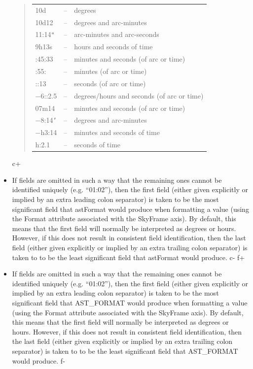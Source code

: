 \documentclass[twoside,11pt]{starlink}
\begin{document}
\begin{itemize}
\begin{quote}
\begin{tabular}{lll}
10d & -- & degrees \\
10d12 & -- & degrees and arc-minutes \\
11:14\texttt{"} & -- & arc-minutes and arc-seconds \\
9h13s & -- & hours and seconds of time \\
:45:33 & -- & minutes and seconds (of arc or time) \\
:55: & -- & minutes (of arc or time) \\
::13 & -- & seconds (of arc or time) \\
$-$6::2.5 & -- & degrees/hours and seconds (of arc or time) \\
07m14 & -- & minutes and seconds (of arc or time) \\
$-$8:14\texttt{'} & -- & degrees and arc-minutes \\
$-$h3:14 & -- & minutes and seconds of time \\
h:2.1 & -- & seconds of time
\end{tabular}
\end{quote}

c+
\item If fields are omitted in such a way that the remaining ones
cannot be identified uniquely (e.g. ``01:02''), then the first field
(either given explicitly or implied by an extra leading colon
separator) is taken to be the most significant field that astFormat
would produce when formatting a value (using the Format attribute
associated with the SkyFrame axis). By default, this means that the
first field will normally be interpreted as degrees or hours. However,
if this does not result in consistent field identification, then the
last field (either given explicitly or implied by an extra trailing
colon separator) is taken to to be the least significant field that
astFormat would produce.
c-
f+
\item If fields are omitted in such a way that the remaining ones
cannot be identified uniquely (e.g. ``01:02''), then the first field
(either given explicitly or implied by an extra leading colon
separator) is taken to be the most significant field that AST\_FORMAT
would produce when formatting a value (using the Format attribute
associated with the SkyFrame axis). By default, this means that the
first field will normally be interpreted as degrees or hours. However,
if this does not result in consistent field identification, then the
last field (either given explicitly or implied by an extra trailing
colon separator) is taken to to be the least significant field that
AST\_FORMAT would produce.
f-

\end{itemize}
\end{document}
